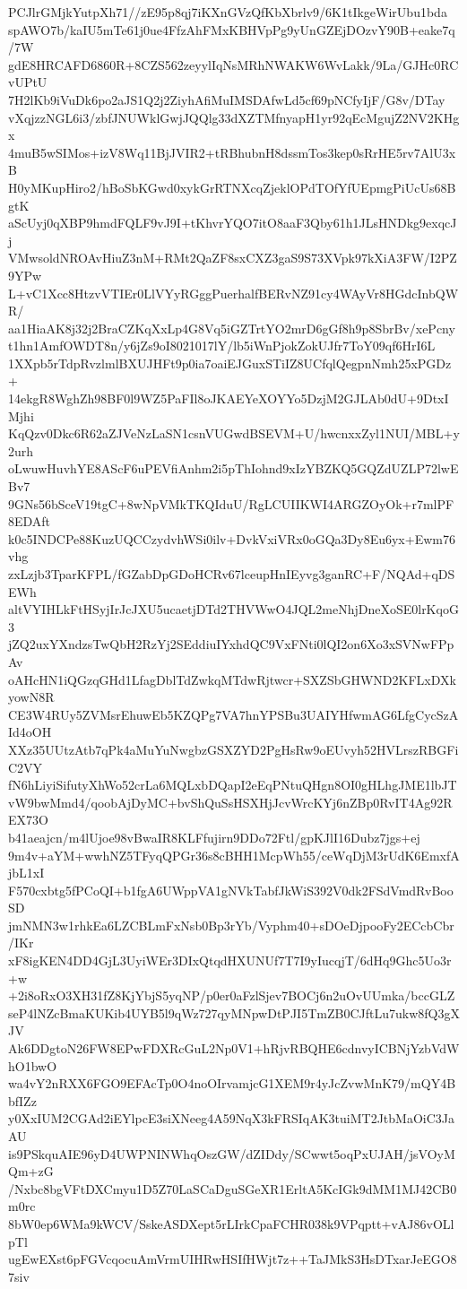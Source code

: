 PCJlrGMjkYutpXh71//zE95p8qj7iKXnGVzQfKbXbrlv9/6K1tIkgeWirUbu1bda
spAWO7b/kaIU5mTe61j0ue4FfzAhFMxKBHVpPg9yUnGZEjDOzvY90B+eake7q/7W
gdE8HRCAFD6860R+8CZS562zeyylIqNsMRhNWAKW6WvLakk/9La/GJHc0RCvUPtU
7H2lKb9iVuDk6po2aJS1Q2j2ZiyhAfiMuIMSDAfwLd5cf69pNCfyIjF/G8v/DTay
vXqjzzNGL6i3/zbfJNUWklGwjJQQlg33dXZTMfnyapH1yr92qEcMgujZ2NV2KHgx
4muB5wSIMos+izV8Wq11BjJVIR2+tRBhubnH8dssmTos3kep0sRrHE5rv7AlU3xB
H0yMKupHiro2/hBoSbKGwd0xykGrRTNXcqZjeklOPdTOfYfUEpmgPiUcUs68BgtK
aScUyj0qXBP9hmdFQLF9vJ9I+tKhvrYQO7itO8aaF3Qby61h1JLsHNDkg9exqcJj
VMwsoldNROAvHiuZ3nM+RMt2QaZF8sxCXZ3gaS9S73XVpk97kXiA3FW/I2PZ9YPw
L+vC1Xcc8HtzvVTIEr0LlVYyRGggPuerhalfBERvNZ91cy4WAyVr8HGdcInbQWR/
aa1HiaAK8j32j2BraCZKqXxLp4G8Vq5iGZTrtYO2mrD6gGf8h9p8SbrBv/xePcny
t1hn1AmfOWDT8n/y6jZs9oI8021017lY/lb5iWnPjokZokUJfr7ToY09qf6HrI6L
1XXpb5rTdpRvzlmlBXUJHFt9p0ia7oaiEJGuxSTiIZ8UCfqlQegpnNmh25xPGDz+
14ekgR8WghZh98BF0l9WZ5PaFIl8oJKAEYeXOYYo5DzjM2GJLAb0dU+9DtxIMjhi
KqQzv0Dkc6R62aZJVeNzLaSN1csnVUGwdBSEVM+U/hwcnxxZyl1NUI/MBL+y2urh
oLwuwHuvhYE8AScF6uPEVfiAnhm2i5pThIohnd9xIzYBZKQ5GQZdUZLP72lwEBv7
9GNs56bSceV19tgC+8wNpVMkTKQIduU/RgLCUIIKWI4ARGZOyOk+r7mlPF8EDAft
k0c5INDCPe88KuzUQCCzydvhWSi0ilv+DvkVxiVRx0oGQa3Dy8Eu6yx+Ewm76vhg
zxLzjb3TparKFPL/fGZabDpGDoHCRv67lceupHnIEyvg3ganRC+F/NQAd+qDSEWh
altVYIHLkFtHSyjIrJcJXU5ucaetjDTd2THVWwO4JQL2meNhjDneXoSE0lrKqoG3
jZQ2uxYXndzsTwQbH2RzYj2SEddiuIYxhdQC9VxFNti0lQI2on6Xo3xSVNwFPpAv
oAHcHN1iQGzqGHd1LfagDblTdZwkqMTdwRjtwcr+SXZSbGHWND2KFLxDXkyowN8R
CE3W4RUy5ZVMsrEhuwEb5KZQPg7VA7hnYPSBu3UAIYHfwmAG6LfgCycSzAId4oOH
XXz35UUtzAtb7qPk4aMuYuNwgbzGSXZYD2PgHsRw9oEUvyh52HVLrszRBGFiC2VY
fN6hLiyiSifutyXhWo52crLa6MQLxbDQapI2eEqPNtuQHgn8OI0gHLhgJME1lbJT
vW9bwMmd4/qoobAjDyMC+bvShQuSsHSXHjJcvWrcKYj6nZBp0RvIT4Ag92REX73O
b41aeajcn/m4lUjoe98vBwaIR8KLFfujirn9DDo72Ftl/gpKJlI16Dubz7jgs+ej
9m4v+aYM+wwhNZ5TFyqQPGr36s8cBHH1McpWh55/ceWqDjM3rUdK6EmxfAjbL1xI
F570cxbtg5fPCoQI+b1fgA6UWppVA1gNVkTabfJkWiS392V0dk2FSdVmdRvBooSD
jmNMN3w1rhkEa6LZCBLmFxNsb0Bp3rYb/Vyphm40+sDOeDjpooFy2ECcbCbr/IKr
xF8igKEN4DD4GjL3UyiWEr3DIxQtqdHXUNUf7T7I9yIucqjT/6dHq9Ghc5Uo3r+w
+2i8oRxO3XH31fZ8KjYbjS5yqNP/p0er0aFzlSjev7BOCj6n2uOvUUmka/bccGLZ
seP4lNZcBmaKUKib4UYB5l9qWz727qyMNpwDtPJI5TmZB0CJftLu7ukw8fQ3gXJV
Ak6DDgtoN26FW8EPwFDXRcGuL2Np0V1+hRjvRBQHE6cdnvyICBNjYzbVdWhO1bwO
wa4vY2nRXX6FGO9EFAcTp0O4noOIrvamjcG1XEM9r4yJcZvwMnK79/mQY4BbfIZz
y0XxIUM2CGAd2iEYlpcE3siXNeeg4A59NqX3kFRSIqAK3tuiMT2JtbMaOiC3JaAU
is9PSkquAIE96yD4UWPNINWhqOszGW/dZIDdy/SCwwt5oqPxUJAH/jsVOyMQm+zG
/Nxbc8bgVFtDXCmyu1D5Z70LaSCaDguSGeXR1ErltA5KcIGk9dMM1MJ42CB0m0rc
8bW0ep6WMa9kWCV/SskeASDXept5rLIrkCpaFCHR038k9VPqptt+vAJ86vOLlpTl
ugEwEXst6pFGVcqocuAmVrmUIHRwHSIfHWjt7z++TaJMkS3HsDTxarJeEGO87siv
